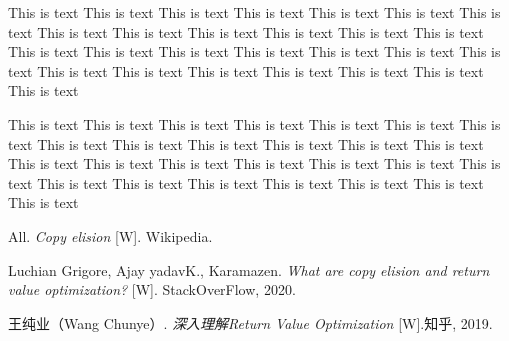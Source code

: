 \documentclass[a4paper]{uestcreport}
\begin{document}
This is text This is text This is text This is text This is text This is text This is text This is text This is text This is text This is text This is text This is text This is text This is text This is text This is text This is text This is text This is text This is text This is text This is text This is text This is text This is text This is text 

This is text This is text This is text This is text This is text This is text This is text This is text This is text This is text This is text This is text This is text This is text This is text This is text This is text This is text This is text This is text This is text This is text This is text This is text This is text This is text This is text 

\newpage

\thispagestyle{fancy}
\fancyhead[L]{}
\fancyhead[R]{}

\begin{thebibliography}{9}
    All.
    \textit{Copy elision}
    [W]. Wikipedia.

    Luchian Grigore, Ajay yadavK., Karamazen.
    \textit{What are copy elision and return value optimization?}
    [W]. StackOverFlow, 2020.

    王纯业（Wang Chunye）.
    \textit{深入理解Return Value Optimization}
    [W].知乎, 2019.
\end{thebibliography}
\end{document}
